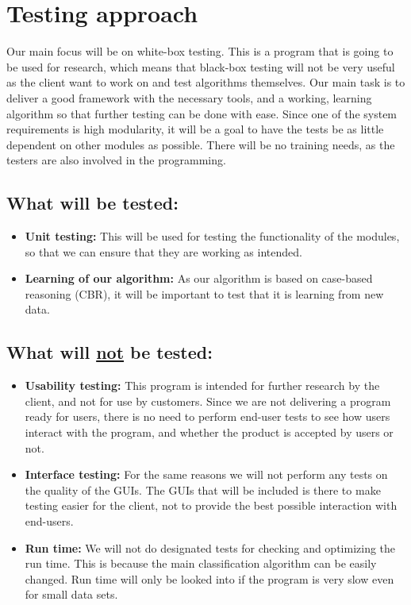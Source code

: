 \section{Testing approach}
Our main focus will be on white-box testing. This is a program that is going to be used for research, which means that black-box testing will not be very useful as the client want to work on and test algorithms themselves. Our main task is to deliver a good framework with the necessary tools, and a working, learning algorithm so that further testing can be done with ease. Since one of the system requirements is high modularity, it will be a goal to have the tests be as little dependent on other modules as possible. There will be no training needs, as the testers are also involved in the programming.

		\subsection*{What will be tested:}
			\begin{itemize}
				\renewcommand{\labelitemi}{$\bullet$}
					\item \textbf{Unit testing:} This will be used for testing the functionality of the modules, so that we can ensure that they are working as intended.
					\item \textbf{Learning of our algorithm:} As our algorithm is based on case-based reasoning (CBR), it will be important to test that it is learning from new data.
			\end{itemize}

		\subsection*{What will \underline{not} be tested:}
			\begin{itemize}
				\renewcommand{\labelitemi}{$\bullet$}
					\item \textbf{Usability testing:} This program is intended for further research by the client, and not for use by customers. Since we are not delivering a program ready for users, there is no need to perform end-user tests to see how users interact with the 							program, and whether the product is accepted by users or not.
					\item \textbf{Interface testing:} For the same reasons we will not perform any tests on the quality of the GUIs. The GUIs that will be included is there to make testing easier for the client, not to provide the best possible interaction with end-users.
					\item \textbf{Run time:} We will not do designated tests for checking and optimizing the run time. This is because the main classification algorithm can be easily changed. Run time will only be looked into if the program is very slow even for small data sets.
			\end{itemize}
		
